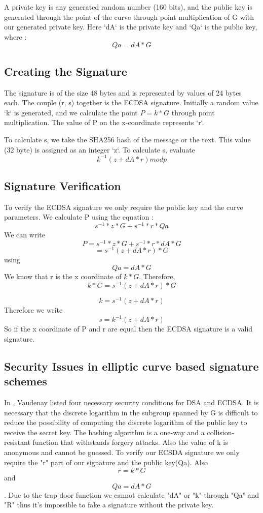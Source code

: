 \documentclass{report}
\begin{document}
A private key is any generated random number (160 bits), and the public key is generated through the point of the curve through point multiplication of G with our generated private key. 
Here ‘dA‘ is the private key and ‘Qa‘ is the public key, where : $$Qa = dA * G$$ \cite{oswald2002introduction}

\subsection{Creating the Signature}
 The signature is of the size 48 bytes and is represented by values of 24 bytes each. The couple (r, s) together is the ECDSA signature.
Initially a random value ‘k‘ is generated, and we calculate the point $P=k*G$ through point multiplication. The value of P on the x-coordinate represents ‘r‘. \cite{harper1992public}

$$$$
 To calculate s, we take the SHA256 hash of the message or the text. This value (32 byte) is assigned as an integer ‘z‘. To calculate s, evaluate
  $$k^{-1} (z + dA* r) mod p$$
\subsection{Signature Verification}
To verify the ECDSA signature we only require the public key and the curve parameters. We calculate P using the equation :
$$ s^{-1}*z*G + s^{-1} *r* Qa$$
We can write
$$P = s^{-1}*z*G + s^{-1}* r * dA*G$$ 
    $$ = s^{-1} (z + dA* r) * G$$ using $$Qa = dA*G$$
We know that r is the x coordinate of $k * G$. Therefore,
$$k*G = s^{-1} (z + dA * r) *G$$

$$k = s^{-1} (z + dA * r)$$
Therefore we write
$$s = k^{-1} (z + dA *r)$$
So if the x coordinate of P and r are equal then the ECDSA signature is a valid signature.

\subsection{Security Issues in elliptic curve based signature schemes}
In \cite{vaudenay2003security}, Vaudenay listed four necessary security
conditions for DSA and ECDSA. It is necessary that the 
discrete logarithm in the subgroup spanned by G 
is difficult to reduce the possibility of computing the discrete
logarithm of the public key to receive the secret key. 
The hashing algorithm is a one-way and
a collision-resistant function that withstands forgery attacks.
Also the value of k is anonymous and cannot be guessed. \cite{WinNT22}
To verify our ECSDA signature we only require the "r" part of our signature and the public key(Qa). Also $$r=k*G$$ and $$Qa = dA*G$$. Due to the trap door function we cannot calculate "dA" or "k" through "Qa" and "R" thus it's impossible to fake a signature without the private key.
\end{document}
